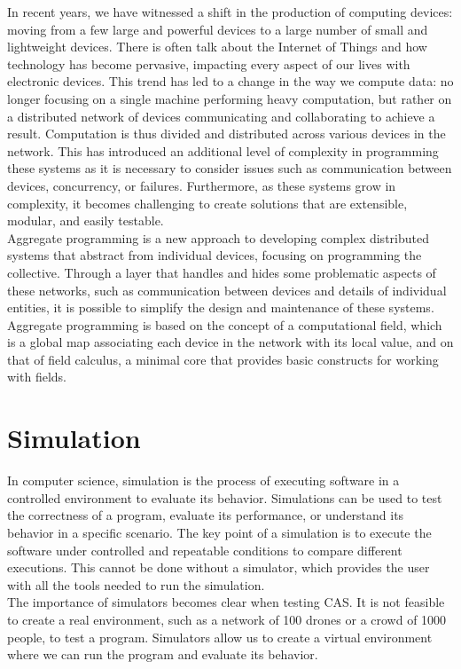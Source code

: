 \documentclass[12pt,a4paper,openright,twoside]{book}
\begin{document}
In recent years, we have witnessed a shift in the production of computing devices: moving from a few large and powerful devices to a large number of small and lightweight devices. 
There is often talk about the Internet of Things and how technology has become pervasive, impacting every aspect of our lives with electronic devices.
This trend has led to a change in the way we compute data: no longer focusing on a single machine performing heavy computation, but rather on a distributed network of devices communicating and collaborating to achieve a result. 
Computation is thus divided and distributed across various devices in the network. 
This has introduced an additional level of complexity in programming these systems as it is necessary to consider issues such as communication between devices, 
concurrency, or failures. Furthermore, as these systems grow in complexity, it becomes challenging to create solutions that are extensible, modular, and easily testable. \cite{DBLP:conf/ecoop/CasadeiV16} \\

Aggregate programming is a new approach to developing complex distributed systems that abstract from individual devices, focusing on programming the collective. 
Through a layer that handles and hides some problematic aspects of these networks, such as communication between devices and details of individual entities, 
it is possible to simplify the design and maintenance of these systems. \cite{DBLP:journals/computer/BealPV15, DBLP:conf/sfm/BealV16} \\

Aggregate programming is based on the concept of a computational field, which is a global map associating each device in the network with its local value, 
and on that of field calculus, a minimal core that provides basic constructs for working with fields. \cite{DBLP:journals/corr/ViroliADPB16}

\section{Simulation}

In computer science, simulation is the process of executing software in a controlled environment to evaluate its behavior. 
Simulations can be used to test the correctness of a program, evaluate its performance, or understand its behavior in a specific scenario. 
The key point of a simulation is to execute the software under controlled and repeatable conditions to compare different executions. 
This cannot be done without a simulator, which provides the user with all the tools needed to run the simulation. \cite{argun2021simulation, bagrodia1998parsec} \\
The importance of simulators becomes clear when testing \ac{CAS}. 
It is not feasible to create a real environment, such as a network of 100 drones or a crowd of 1000 people, to test a program.
Simulators allow us to create a virtual environment where we can run the program and evaluate its behavior. \\
\end{document}
